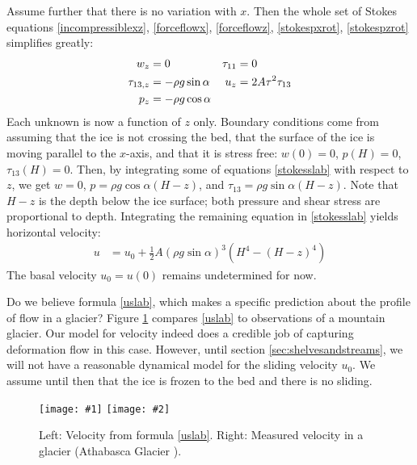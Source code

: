 \documentclass[letterpaper,final,12pt,reqno]{amsart}
\newcommand{\twofigsizes}[5]{
\begin{figure}[ht]
\centering
\texttt{[image: \#1]} \quad
\texttt{[image: \#2]}
\caption{#3}
\label{fig:#1}
\end{figure}}
\begin{document}
Assume further that there is no variation with $x$. Then the whole set of Stokes equations \eqref{incompressiblexz}, \eqref{forceflowx}, \eqref{forceflowz}, \eqref{stokespxrot}, \eqref{stokespzrot} simplifies greatly:
\begin{align}
w_z &= 0 &   \tau_{11} &= 0 \label{stokesslab} \\
\tau_{13,z} &= - \rho g \sin\alpha &   u_z &= 2 A \tau^2 \tau_{13} \notag \\
p_z &= - \rho g \cos\alpha \notag
\end{align}
Each unknown is now a function of $z$ only.  Boundary conditions come from assuming that the ice is not crossing the bed, that the surface of the ice is moving parallel to the $x$-axis, and that it is stress free: $w(0)=0$, $p(H)=0$, $\tau_{13}(H)=0$.  Then, by integrating some of equations \eqref{stokesslab} with respect to $z$, we get $w=0$, $p = \rho g \cos\alpha (H-z)$, and $\tau_{13} = \rho g \sin\alpha (H-z)$.  Note that $H-z$ is the depth below the ice surface; both pressure and shear stress are proportional to depth.  Integrating the remaining equation in \eqref{stokesslab} yields horizontal velocity:
\begin{align}
u &= u_0 + \frac{1}{2} A (\rho g \sin\alpha)^3  \left(H^4 - (H-z)^4\right)  \label{uslab}
\end{align}
The basal velocity $u_0=u(0)$ remains undetermined for now.

Do we believe formula \eqref{uslab}, which makes a specific prediction about the profile of flow in a glacier?  Figure \ref{fig:slabvel} compares \eqref{uslab} to observations of a mountain glacier.  Our model for velocity indeed does a credible job of capturing deformation flow in this case.  However, until section \ref{sec:shelvesandstreams}, we will not have a reasonable dynamical model for the sliding velocity $u_0$.  We assume until then that the ice is frozen to the bed and there is no sliding.

\twofigsizes{slabvel}{athabasca-deform}{Left:  Velocity from formula \eqref{uslab}.  Right:  Measured velocity in a glacier (Athabasca Glacier \cite{SavagePaterson}).}{2.0in}{1.8in}
\end{document}
